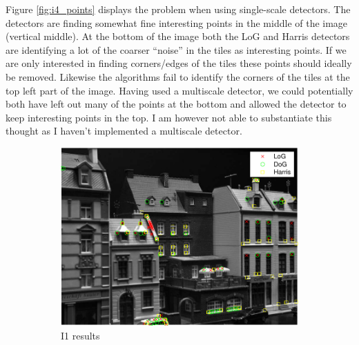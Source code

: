 \documentclass[11pt,a4paper]{article}
\begin{document}
Figure \ref{fig:i4_points} displays the problem when using single-scale
detectors. The detectors are finding somewhat fine interesting points in the
middle of the image (vertical middle). At the bottom of the image both the LoG
and Harris detectors are identifying a lot of the coarser ``noise'' in the tiles
as interesting points. If we are only interested in finding corners/edges of the
tiles these points should ideally be removed. Likewise the algorithms fail to
identify the corners of the tiles at the top left part of the image. Having used
a multiscale detector, we could potentially both have left out many of the
points at the bottom and allowed the detector to keep interesting points in the
top. I am however not able to substantiate this thought as I haven't implemented
a multiscale detector.

\begin{figure}[h]
    \centering
    \begin{subfigure}[t]{0.8\textwidth}
        \includegraphics[width=\textwidth]{images/i1_points.pdf}
        \caption{I1 results}
        \label{fig:i1_points}
    \end{subfigure}
    \begin{subfigure}[t]{0.8\textwidth}

\end{subfigure}
\end{figure}
\end{document}
